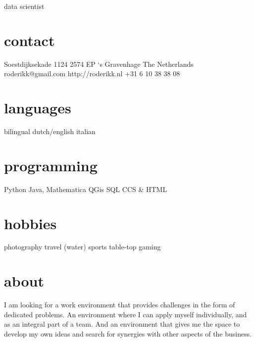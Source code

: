 \documentclass[a4paper]{friggeri-cv}
\begin{document}
       {data scientist}


\begin{aside}
  \section{contact}
    Soestdijksekade 1124
    2574 EP `s Gravenhage
    The Netherlands
    ~
    roderikk@gmail.com
    http://roderikk.nl
    +31 6 10 38 38 08
    ~
  \section{languages}
    bilingual dutch/english
    italian
  \section{programming}
    Python
    Java, Mathematica
    QGis
    SQL
    CCS \& HTML
  \section{hobbies}
    photography
    travel
    (water) sports
    table-top gaming
\end{aside}

\section{about}


I am looking for a work environment that provides challenges in the form of dedicated problems.
An environment where I can apply myself individually, and as an integral part of a team.
And an environment that gives me the space to develop my own ideas and search for synergies with other aspects of the business.
\end{document}
